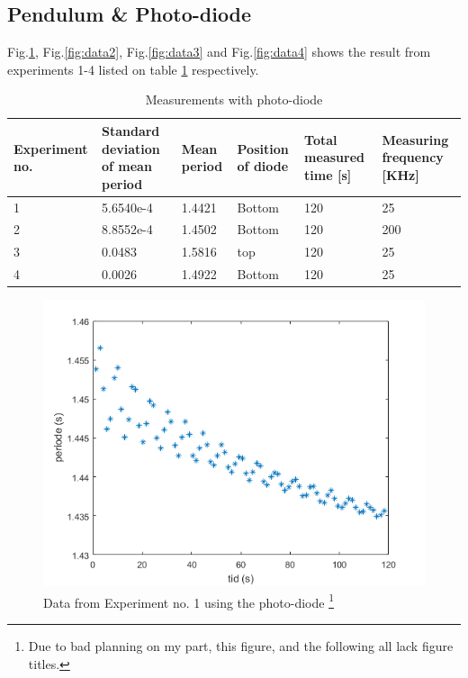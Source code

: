 \documentclass[%
 reprint,
 amsmath,amssymb,
 aps,
]{revtex4-1}
\begin{document}
    \subsection{Pendulum \& Photo-diode}

    Fig.\ref{fig:data1}, Fig.\ref{fig:data2}, Fig.\ref{fig:data3} and Fig.\ref{fig:data4} shows the result from experiments 1-4 listed on table \ref{tab:photodiode} respectively.

    \begin{table}[h] %
        \caption{Measurements with photo-diode}
        \label{tab:photodiode}
        \begin{tabular}{| p{1.6cm} | p{1.4cm} | p{1.1cm} | p{1.3cm} | p{1.3cm} | p{1.5cm} |}
            \hline
            Experiment no. & Standard deviation of mean period & Mean period & Position of diode & Total measured time [s] & Measuring frequency [KHz] \\ \hline
            1 & 5.6540e-4 & 1.4421 & Bottom & 120 & 25 \\ \hline
            2 & 8.8552e-4 & 1.4502 & Bottom & 120 & 200 \\ \hline
            3 & 0.0483 & 1.5816 & top & 120 & 25 \\ \hline
            4 & 0.0026 & 1.4922 & Bottom & 120 & 25 \\ \hline
        \end{tabular}
    \end{table}
    
    \begin{figure}[h!]
    	\center
    	\includegraphics[scale=0.6]{forsok1fig1}
    	\caption{Data from Experiment no. 1 using the photo-diode
    	\footnote{Due to bad planning on my part, this figure, and the following all lack figure titles.
    	}}
        \label{fig:data1}
    \end{figure}
\end{document}
